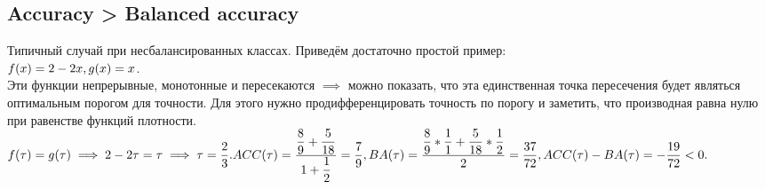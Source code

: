 \documentclass{article}
\begin{document}
\subsection{Accuracy > Balanced accuracy}
Типичный случай при несбалансированных классах. Приведём достаточно простой пример:\\
$f(x) = 2 - 2x,\\
g(x) = x$.\\
Эти функции непрерывные, монотонные и пересекаются $\implies$ можно показать, что эта единственная точка пересечения будет являться оптимальным порогом для точности. Для этого нужно продифференцировать точность по порогу и заметить, что производная равна нулю при равенстве функций плотности.\\
$f(\tau) = g(\tau) \implies 2 - 2\tau = \tau \implies \tau = \dfrac{2}{3}.\\
ACC(\tau) = \dfrac{\dfrac{8}{9} + \dfrac{5}{18}}{1 + \dfrac{1}{2}} = \dfrac{7}{9},\\
BA(\tau) = \dfrac{\dfrac{8}{9} * \dfrac{1}{1} + \dfrac{5}{18} * \dfrac{1}{2}}{2} = \dfrac{37}{72},\\
ACC(\tau) - BA(\tau) = -\dfrac{19}{72} < 0.$
\end{document}
